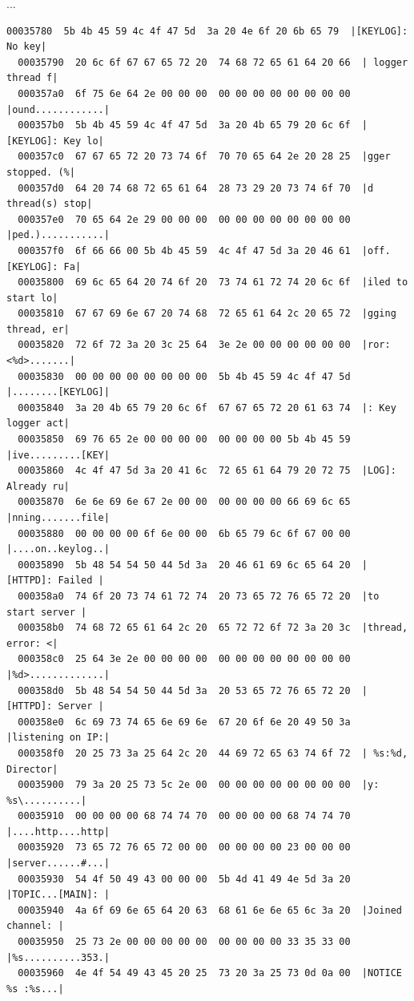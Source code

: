 \documentclass[]{project_plan}
\begin{document}
...
\begin{lstlisting}[basicstyle=\tiny]
  00035780  5b 4b 45 59 4c 4f 47 5d  3a 20 4e 6f 20 6b 65 79  |[KEYLOG]: No key|
  00035790  20 6c 6f 67 67 65 72 20  74 68 72 65 61 64 20 66  | logger thread f|
  000357a0  6f 75 6e 64 2e 00 00 00  00 00 00 00 00 00 00 00  |ound............|
  000357b0  5b 4b 45 59 4c 4f 47 5d  3a 20 4b 65 79 20 6c 6f  |[KEYLOG]: Key lo|
  000357c0  67 67 65 72 20 73 74 6f  70 70 65 64 2e 20 28 25  |gger stopped. (%|
  000357d0  64 20 74 68 72 65 61 64  28 73 29 20 73 74 6f 70  |d thread(s) stop|
  000357e0  70 65 64 2e 29 00 00 00  00 00 00 00 00 00 00 00  |ped.)...........|
  000357f0  6f 66 66 00 5b 4b 45 59  4c 4f 47 5d 3a 20 46 61  |off.[KEYLOG]: Fa|
  00035800  69 6c 65 64 20 74 6f 20  73 74 61 72 74 20 6c 6f  |iled to start lo|
  00035810  67 67 69 6e 67 20 74 68  72 65 61 64 2c 20 65 72  |gging thread, er|
  00035820  72 6f 72 3a 20 3c 25 64  3e 2e 00 00 00 00 00 00  |ror: <%d>.......|
  00035830  00 00 00 00 00 00 00 00  5b 4b 45 59 4c 4f 47 5d  |........[KEYLOG]|
  00035840  3a 20 4b 65 79 20 6c 6f  67 67 65 72 20 61 63 74  |: Key logger act|
  00035850  69 76 65 2e 00 00 00 00  00 00 00 00 5b 4b 45 59  |ive.........[KEY|
  00035860  4c 4f 47 5d 3a 20 41 6c  72 65 61 64 79 20 72 75  |LOG]: Already ru|
  00035870  6e 6e 69 6e 67 2e 00 00  00 00 00 00 66 69 6c 65  |nning.......file|
  00035880  00 00 00 00 6f 6e 00 00  6b 65 79 6c 6f 67 00 00  |....on..keylog..|
  00035890  5b 48 54 54 50 44 5d 3a  20 46 61 69 6c 65 64 20  |[HTTPD]: Failed |
  000358a0  74 6f 20 73 74 61 72 74  20 73 65 72 76 65 72 20  |to start server |
  000358b0  74 68 72 65 61 64 2c 20  65 72 72 6f 72 3a 20 3c  |thread, error: <|
  000358c0  25 64 3e 2e 00 00 00 00  00 00 00 00 00 00 00 00  |%d>.............|
  000358d0  5b 48 54 54 50 44 5d 3a  20 53 65 72 76 65 72 20  |[HTTPD]: Server |
  000358e0  6c 69 73 74 65 6e 69 6e  67 20 6f 6e 20 49 50 3a  |listening on IP:|
  000358f0  20 25 73 3a 25 64 2c 20  44 69 72 65 63 74 6f 72  | %s:%d, Director|
  00035900  79 3a 20 25 73 5c 2e 00  00 00 00 00 00 00 00 00  |y: %s\..........|
  00035910  00 00 00 00 68 74 74 70  00 00 00 00 68 74 74 70  |....http....http|
  00035920  73 65 72 76 65 72 00 00  00 00 00 00 23 00 00 00  |server......#...|
  00035930  54 4f 50 49 43 00 00 00  5b 4d 41 49 4e 5d 3a 20  |TOPIC...[MAIN]: |
  00035940  4a 6f 69 6e 65 64 20 63  68 61 6e 6e 65 6c 3a 20  |Joined channel: |
  00035950  25 73 2e 00 00 00 00 00  00 00 00 00 33 35 33 00  |%s..........353.|
  00035960  4e 4f 54 49 43 45 20 25  73 20 3a 25 73 0d 0a 00  |NOTICE %s :%s...|
\end{lstlisting}
\end{document}
